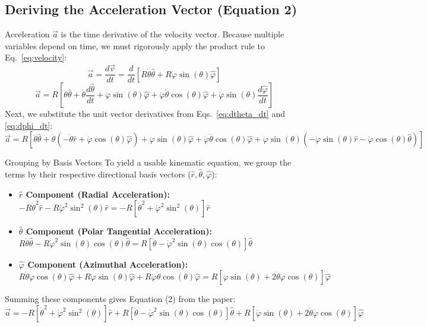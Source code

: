 \documentclass[11pt,letterpaper]{article}
\begin{document}
\subsection{Deriving the Acceleration Vector (Equation 2)}
Acceleration $\vec{a}$ is the time derivative of the velocity vector. Because multiple variables depend on time, we must rigorously apply the product rule to Eq.~\eqref{eq:velocity}:
\begin{equation}
\vec{a} = \frac{d\vec{v}}{dt} = \frac{d}{dt} \left[ R\dot{\theta}\hat{\theta} + R\dot{\varphi}\sin(\theta)\hat{\varphi} \right]
\end{equation}
\begin{equation}
\vec{a} = R \left[ \ddot{\theta}\hat{\theta} + \dot{\theta}\frac{d\hat{\theta}}{dt} + \ddot{\varphi}\sin(\theta)\hat{\varphi} + \dot{\varphi}\dot{\theta}\cos(\theta)\hat{\varphi} + \dot{\varphi}\sin(\theta)\frac{d\hat{\varphi}}{dt} \right]
\end{equation}
Next, we substitute the unit vector derivatives from Eqs.~\eqref{eq:dtheta_dt} and \eqref{eq:dphi_dt}:
\begin{equation}
\vec{a} = R \left[ \ddot{\theta}\hat{\theta} + \dot{\theta}(-\dot{\theta}\hat{r} + \dot{\varphi}\cos(\theta)\hat{\varphi}) + \ddot{\varphi}\sin(\theta)\hat{\varphi} + \dot{\varphi}\dot{\theta}\cos(\theta)\hat{\varphi} + \dot{\varphi}\sin(\theta)(-\dot{\varphi}\sin(\theta)\hat{r} - \dot{\varphi}\cos(\theta)\hat{\theta}) \right]
\end{equation}

\begin{equationbreakdown}{Grouping by Basis Vectors}
To yield a usable kinematic equation, we group the terms by their respective directional basis vectors ($\hat{r}, \hat{\theta}, \hat{\varphi}$):
\begin{itemize}
    \item \textbf{$\hat{r}$ Component (Radial Acceleration):} 
    $-R\dot{\theta}^2\hat{r} - R\dot{\varphi}^2\sin^2(\theta)\hat{r} = -R[\dot{\theta}^2 + \dot{\varphi}^2\sin^2(\theta)]\hat{r}$
    \item \textbf{$\hat{\theta}$ Component (Polar Tangential Acceleration):} 
    $R\ddot{\theta}\hat{\theta} - R\dot{\varphi}^2\sin(\theta)\cos(\theta)\hat{\theta} = R[\ddot{\theta} - \dot{\varphi}^2\sin(\theta)\cos(\theta)]\hat{\theta}$
    \item \textbf{$\hat{\varphi}$ Component (Azimuthal Acceleration):} 
    $R\dot{\theta}\dot{\varphi}\cos(\theta)\hat{\varphi} + R\ddot{\varphi}\sin(\theta)\hat{\varphi} + R\dot{\varphi}\dot{\theta}\cos(\theta)\hat{\varphi} = R[\ddot{\varphi}\sin(\theta) + 2\dot{\theta}\dot{\varphi}\cos(\theta)]\hat{\varphi}$
\end{itemize}
Summing these components gives Equation (2) from the paper:
\begin{equation}\label{eq:acceleration}
\vec{a} = -R[\dot{\theta}^2 + \dot{\varphi}^2\sin^2(\theta)]\hat{r} + R[\ddot{\theta} - \dot{\varphi}^2\sin(\theta)\cos(\theta)]\hat{\theta} + R[\ddot{\varphi}\sin(\theta) + 2\dot{\theta}\dot{\varphi}\cos(\theta)]\hat{\varphi}
\end{equation}
\end{equationbreakdown}
\end{document}
